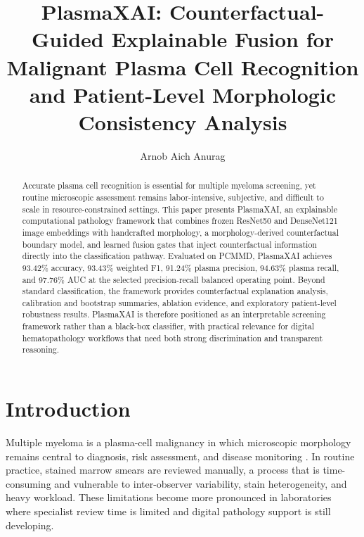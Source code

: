 \documentclass[runningheads]{llncs}
\begin{document}
\title{PlasmaXAI: Counterfactual-Guided Explainable Fusion for Malignant Plasma Cell Recognition and Patient-Level Morphologic Consistency Analysis}
\author{Arnob Aich Anurag}

\maketitle
\thispagestyle{plain}

\begin{abstract}
Accurate plasma cell recognition is essential for multiple myeloma screening, yet routine microscopic assessment remains labor-intensive, subjective, and difficult to scale in resource-constrained settings. This paper presents PlasmaXAI, an explainable computational pathology framework that combines frozen ResNet50 and DenseNet121 image embeddings with handcrafted morphology, a morphology-derived counterfactual boundary model, and learned fusion gates that inject counterfactual information directly into the classification pathway. Evaluated on PCMMD, PlasmaXAI achieves 93.42\% accuracy, 93.43\% weighted F1, 91.24\% plasma precision, 94.63\% plasma recall, and 97.76\% AUC at the selected precision-recall balanced operating point. Beyond standard classification, the framework provides counterfactual explanation analysis, calibration and bootstrap summaries, ablation evidence, and exploratory patient-level robustness results. PlasmaXAI is therefore positioned as an interpretable screening framework rather than a black-box classifier, with practical relevance for digital hematopathology workflows that need both strong discrimination and transparent reasoning.
\end{abstract}

\section{Introduction}
Multiple myeloma is a plasma-cell malignancy in which microscopic morphology remains central to diagnosis, risk assessment, and disease monitoring \cite{mmreview}. In routine practice, stained marrow smears are reviewed manually, a process that is time-consuming and vulnerable to inter-observer variability, stain heterogeneity, and heavy workload. These limitations become more pronounced in laboratories where specialist review time is limited and digital pathology support is still developing.
\end{document}
